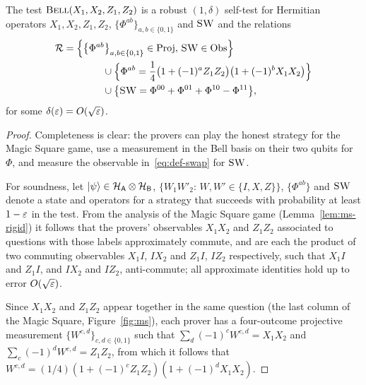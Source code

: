 \begin{lemma}\label{lem:bell-rigid-test}
The test $\textsc{Bell}(X_1,X_2,Z_1,Z_2)$ is a robust $(1,\delta)$ self-test for Hermitian operators $X_1,X_2,Z_1,Z_2$, $\{ \Phi^{ab}\}_{a,b\in\{0,1\}}$ and $\textsc{SW}$ and the relations 
\begin{align*}
\mathcal{R}&= \Big\{\big\{\Phi^{ab}\big\}_{a,b\in\{0,1\}}\in\mathrm{Proj},\,
  \textsc{SW}\in\mathrm{Obs}\Big\}\\
  &\qquad\qquad\cup \Big\{\Phi^{ab} = \frac{1}{4}\big(1+(-1)^a Z_1Z_2\big)\big(1+(-1)^bX_1X_2\big) \Big\}\\
&\qquad\qquad \cup \big\{\textsc{SW} = \Phi^{00}+\Phi^{01}+\Phi^{10}-\Phi^{11}\big\},
\end{align*}
 for some $\delta(\varepsilon) = O(\sqrt{\varepsilon})$.
\end{lemma}


\begin{proof}
Completeness is clear: the provers can play the honest strategy for the Magic Square game, use a measurement in the Bell basis on their two qubits for $\Phi$, and measure the  observable in~\eqref{eq:def-swap} for $\textsc{SW}$. 

For soundness, let $|\psi\rangle\in\mathcal{H}_{\textsf{A}}\otimes \mathcal{H}_{\textsf{B}}$, $\{W_1W'_2:\, W,W'\in\{I,X,Z\}\}$, $\{\Phi^{ab}\}$ and $\textsc{SW}$ denote a state and operators for a strategy that succeeds with probability at least $1-\varepsilon$ in the test. From the analysis of the Magic Square game (Lemma~\ref{lem:ms-rigid}) it follows that the provers' observables $X_1X_2$ and $Z_1Z_2$ associated to questions with those  labels approximately commute, and are each the product of two commuting observables $X_1I$, $IX_2$ and $Z_1I$, $IZ_2$ respectively, such that $X_1I$ and $Z_1I$, and $IX_2$ and $IZ_2$, anti-commute; all approximate identities hold up to error $O(\sqrt{\varepsilon})$. 

Since $X_1X_2$ and $Z_1Z_2$ appear together in the same question (the last column of the Magic Square, Figure~\ref{fig:ms}), each prover has a four-outcome projective measurement $\{W^{c,d}\}_{c,d\in\{0,1\}}$ such that $\sum_d (-1)^c W^{c,d} = X_1X_2$ and $\sum_c (-1)^dW^{c,d} = Z_1Z_2$, from which it follows that $W^{c,d} = (1/4)(1+(-1)^c Z_1Z_2)(1+(-1)^d X_1X_2)$. 


\end{proof}
